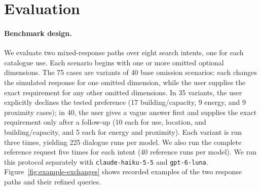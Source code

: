 \documentclass[sigconf,review]{acmart}
\begin{document}
\section{Evaluation}
\label{sec:eval}
\paragraph{Benchmark design.} We evaluate two mixed-response paths over
eight search intents, one for each catalogue use. Each scenario begins
with one or more omitted optional dimensions. The 75 cases are variants
of 40 base omission scenarios: each changes the simulated response for
one omitted dimension, while the user supplies the exact requirement for
any other omitted dimensions. In 35 variants, the user explicitly
declines the tested preference (17 building/capacity, 9 energy, and 9
proximity cases); in 40, the user gives a vague answer first and supplies
the exact requirement only after a follow-up (10 each for use, location,
and building/capacity, and 5 each for energy and proximity). Each variant
is run three times, yielding 225 dialogue runs per model. We also run the complete
reference request five times for each intent (40 reference runs per
model). We ran this protocol separately with \texttt{claude-haiku-5-5}
and \texttt{gpt-6-luna}. Figure~\ref{fig:example-exchanges} shows
recorded examples of the two response paths and their refined queries.
\end{document}
